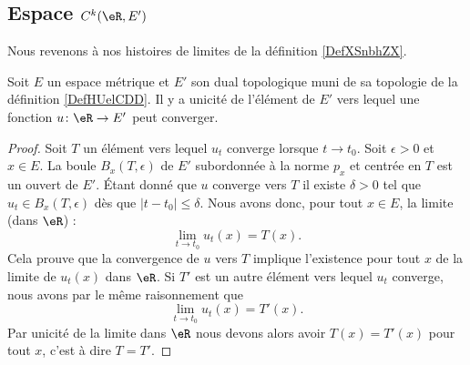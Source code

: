 \subsection{Espace \texorpdfstring{$ C^k(\eR,E')$}{C(R,E')}}

Nous revenons à nos histoires de limites de la définition \ref{DefXSnbhZX}.
\begin{proposition} \label{PropRBCiHbz}
    Soit \( E\) un espace métrique et \( E'\) son dual topologique muni de sa topologie de la définition \ref{DefHUelCDD}. Il y a unicité de l'élément de \( E'\) vers lequel une fonction \( u\colon \eR\to E' \) peut converger.
\end{proposition}

\begin{proof}
    Soit \( T\) un élément vers lequel \( u_t\) converge lorsque \( t\to t_0\). Soit \( \epsilon>0\) et \( x\in E\). La boule \( B_x(T,\epsilon)\) de \( E'\) subordonnée à la norme \( p_x\) et centrée en \( T\) est un ouvert de \( E'\). Étant donné que \( u\) converge vers \( T\) il existe \( \delta>0\) tel que \( u_t\in B_x(T,\epsilon)\) dès que \( | t-t_0 |\leq \delta\). Nous avons donc, pour tout \( x\in E\), la limite (dans \( \eR\)) :
    \begin{equation}
        \lim_{t\to t_0} u_t(x)=T(x).
    \end{equation}
    Cela prouve que la convergence de \( u\) vers \( T\) implique l'existence pour tout \( x\) de la limite de \( u_t(x)\) dans \( \eR\). Si \( T'\) est un autre élément vers lequel \( u_t\) converge, nous avons par le même raisonnement que
    \begin{equation}
        \lim_{t\to t_0} u_t(x)=T'(x).
    \end{equation}
    Par unicité de la limite dans \( \eR\)
    nous devons alors avoir \( T(x)=T'(x)\) pour tout \( x\), c'est à dire \( T=T'\).
\end{proof}

